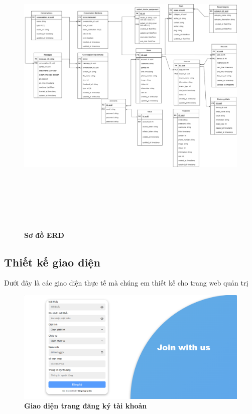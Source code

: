 \begin{figure}[H]
  \centering
  \includegraphics[width=15cm,height=15cm]{Images/system/fmECG_database.png}
  \caption[Sơ đồ ERD]{\bfseries \fontsize{12pt}{0pt}\selectfont Sơ đồ ERD}
  \label{fmECG_architecture-Database} %
\end{figure}

\subsection{Thiết kế giao diện}

Dưới đây là các giao diện thực tế mà chúng em thiết kế cho trang web quản trị
\begin{figure}[H]
  \centering
  \includegraphics[scale=0.4]{Images/server/webUI/register_2.png}
  \caption[Giao diện trang đăng ký tài khoản]{\bfseries \fontsize{12pt}{0pt}\selectfont Giao diện trang đăng ký tài khoản}
  \label{register_2} %
\end{figure}

